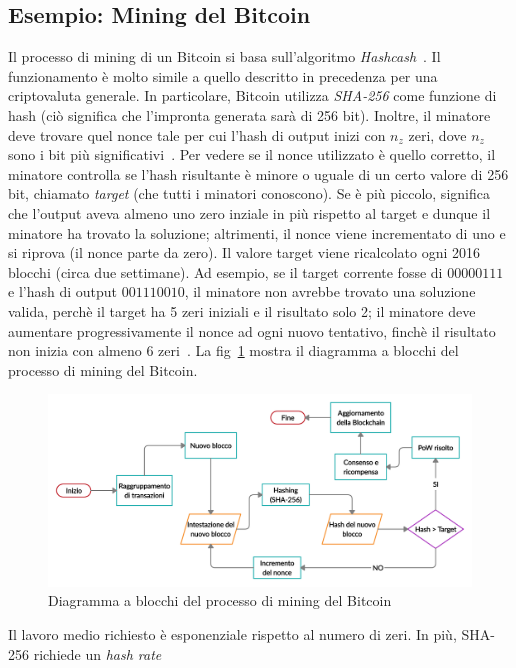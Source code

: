 \subsection{Esempio: Mining del Bitcoin}
Il processo di mining di un Bitcoin si basa sull'algoritmo \textit{Hashcash}~\cite{art:satoshi}. Il funzionamento \`e molto simile a quello descritto in precedenza per una criptovaluta generale. In particolare, Bitcoin utilizza \textit{SHA-256} come funzione di hash (ciò significa che l'impronta generata sarà di 256 bit). Inoltre, il minatore deve trovare quel nonce tale per cui l'hash di output inizi con $n_z$ zeri, dove $n_z$ sono i bit più significativi~\cite{art:bc2}.
Per vedere se il nonce utilizzato \`e quello corretto, il minatore controlla se l'hash risultante \`e minore o uguale di un certo valore di 256 bit, chiamato \textit{target} (che tutti i minatori conoscono). Se \`e più piccolo, significa che l'output aveva almeno uno zero inziale in più rispetto al target e dunque il minatore ha trovato la soluzione; altrimenti, il nonce viene incrementato di uno e si riprova (il nonce parte da zero). Il valore target viene ricalcolato ogni 2016 blocchi (circa due settimane). Ad esempio, se il target corrente fosse di $00000111$ e l'hash di output $001110010$, il minatore non avrebbe trovato una soluzione valida, perch\`e il target ha 5 zeri iniziali e il risultato solo 2; il minatore deve aumentare progressivamente il nonce ad ogni nuovo tentativo, finch\`e il risultato non inizia con almeno 6 zeri~\cite{tesi:venezia}. La fig~\ref{im:flow} mostra il diagramma a blocchi del processo di mining del Bitcoin.
\begin{figure}
\centering
\includegraphics[scale=0.23]{immagini/cap2/4-flow} 
\caption{Diagramma a blocchi del processo di mining del Bitcoin}
\label{im:flow} 
\end{figure}
Il lavoro medio richiesto \`e esponenziale rispetto al numero di zeri. In più, SHA-256 richiede un \textit{hash rate}%
